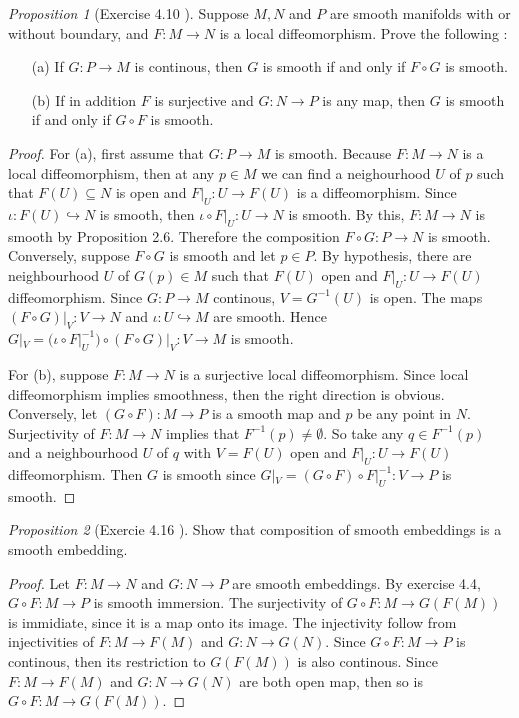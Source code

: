 \documentclass[a4paper]{article}
\theoremstyle{remark}
\newtheorem{prop}{Proposition}
\begin{document}
\begin{prop}[Exercise 4.10 \cite{LeeSM}] Suppose $M,N$ and $P$ are smooth manifolds with or without boundary, and $F : M \to N$ is a local diffeomorphism. Prove the following :
\begin{enumerate}[nolistsep]
\item[(a)] If $G : P \to M$ is continous, then $G$ is smooth if and only if $F \circ G $ is smooth.
\item[(b)] If in addition $F$ is surjective and $G : N \to P$ is any map, then $G$ is smooth if and only if $G \circ F$ is smooth.
\end{enumerate}
\end{prop}
\begin{proof}
For (a), first assume that $G : P \to M$ is smooth. Because $F : M \to N$ is a local diffeomorphism, then at any $p \in M$ we can find a neighourhood $U $ of $p$ such that $F(U) \subseteq N$ is open and $F|_{U} : U \to F(U)$ is a diffeomorphism. Since $\iota : F(U) \hookrightarrow N$ is smooth, then $\iota \circ F|_U : U \to N$ is smooth. By this,  $F : M \to N$ is smooth by Proposition 2.6. Therefore the composition $F \circ G : P \to N$ is smooth. Conversely, suppose $F \circ G$ is smooth and let $p \in P$. By hypothesis, there are neighbourhood $U$ of $G(p) \in M$ such that $F(U)$ open and $F|_U : U \to F(U)$ diffeomorphism. Since $G : P \to M$ continous, $V = G^{-1}(U)$ is open. The maps $(F \circ G)|_V : V \to N$ and $\iota : U \hookrightarrow M$ are smooth. Hence $G|_V = (\iota \circ F|_U^{-1}) \circ (F \circ G)|_V : V \to M$ is smooth.

For (b), suppose $F : M \to N$ is a surjective local diffeomorphism. Since local diffeomorphism implies smoothness, then the right direction is obvious. Conversely, let $(G \circ F) : M \to P$ is a smooth map and $p$ be any point in $N$. Surjectivity of $F : M \to N$ implies that $F^{-1}(p) \neq \emptyset$. So take any $q \in F^{-1}(p)$ and a neighbourhood $U$ of $q$ with $V=F(U)$ open and $F|_U : U \to F(U)$ diffeomorphism. Then $G$ is smooth since $G|_V = (G \circ F) \circ F|_U^{-1} : V \to P$ is smooth. 
\end{proof}

\begin{prop}[Exercie 4.16 \cite{LeeSM}]
Show that composition of smooth embeddings is a smooth embedding.
\end{prop}
\begin{proof}
Let $F :M \to N$ and $G : N \to P$ are smooth embeddings. By exercise 4.4, $G \circ F : M \to P$ is smooth immersion. The surjectivity of $G \circ F : M \to G(F(M))$ is immidiate, since it is a map onto its image. The injectivity follow from injectivities of $F : M \to F(M)$ and $G : N \to G(N)$. Since $G \circ F : M \to P$ is continous, then its restriction to $G(F(M))$ is also continous. Since $F : M \to F(M)$ and $G : N \to G(N)$ are both open map, then so is $G \circ F : M \to G(F(M))$. 
\end{proof}
\end{document}
